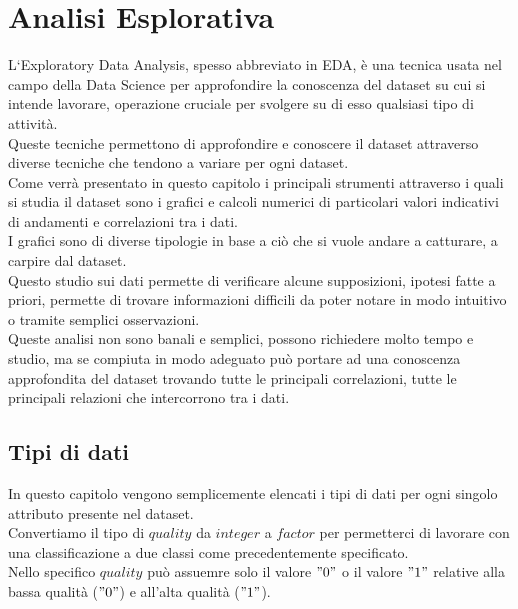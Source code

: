 \chapter{Analisi Esplorativa}
\label{ch:analisi}

L‘Exploratory Data Analysis, spesso abbreviato in EDA, è una tecnica usata nel campo della Data Science per approfondire la conoscenza del dataset su cui si intende lavorare, operazione cruciale per svolgere su di esso qualsiasi tipo di attività.\\
Queste tecniche permettono di approfondire e conoscere il dataset attraverso diverse tecniche che tendono a variare per ogni dataset.\\
Come verrà presentato in questo capitolo i principali strumenti attraverso i quali si studia il dataset sono i grafici e calcoli numerici di particolari valori indicativi di andamenti e correlazioni tra i dati.\\
I grafici sono di diverse tipologie in base a ciò che si vuole andare a catturare, a carpire dal dataset.\\
Questo studio sui dati permette di verificare alcune supposizioni, ipotesi fatte a priori, permette di trovare informazioni difficili da poter notare in modo intuitivo o tramite semplici osservazioni.\\
Queste analisi non sono banali e semplici, possono richiedere molto tempo e studio, ma se compiuta in modo adeguato può portare ad una conoscenza approfondita del dataset trovando tutte le principali correlazioni, tutte le principali relazioni che intercorrono tra i dati.

\section{Tipi di dati}
In questo capitolo vengono semplicemente elencati i tipi di dati per ogni singolo attributo presente nel dataset.\\
Convertiamo il tipo di $quality$ da $integer$ a $factor$ per permetterci di lavorare con una classificazione a due classi come precedentemente specificato.\\
Nello specifico $quality$ può assuemre solo il valore $"0"$ o il valore $"1"$ relative alla bassa qualità ($"0"$) e all'alta qualità ($"1"$).\\

